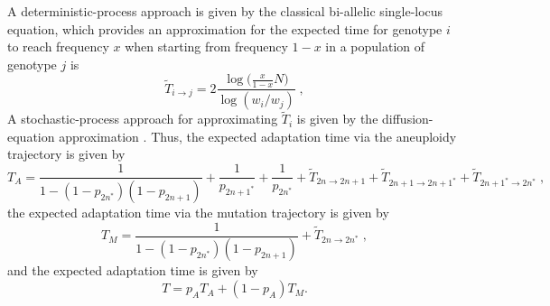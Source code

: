 \documentclass[12pt]{extarticle}
\newtheorem{remark}{Remark}
\begin{document}
A deterministic-process approach is given by the classical bi-allelic single-locus equation, which provides an approximation for the expected time for genotype $i$ to reach frequency $x$ when starting from frequency $1-x$ in a population of genotype $j$ is %
\begin{equation} \label{eq:T_fix_x}
\tilde T_{i \to j} = 2\frac{\log{\big(\frac{x}{1-x}N\big)}}{\log(w_i/w_j)} \;,
\end{equation}
A stochastic-process approach for approximating $\tilde T_i$ is given by the diffusion-equation approximation \citep[eq.~17]{Kimura1969a}. 
Thus, the expected adaptation time via the aneuploidy trajectory is given by
\begin{equation}\label{eq:T_aneu}
 T_A = \frac{1}{1-(1-p_{2n^*})(1-p_{2n+1})} + \frac{1}{p_{2n+1^*}} + \frac{1}{p_{2n^*}} + \tilde T_{2n \to 2n+1} + \tilde T_{2n+1 \to 2n+1^*} + \tilde T_{2n+1^* \to 2n^*} \;,
 \end{equation}
the expected adaptation time via the mutation trajectory is given by 
\begin{equation}\label{eq:T_mut}
T_{M}=\frac{1}{1-(1-p_{2n^*})(1-p_{2n+1})} + \tilde T_{2n \to 2n^*} \;,
\end{equation}
and the expected adaptation time is given by
 \begin{equation}\label{eq:T_total}
 T = p_A T_{A}+(1-p_A) T_{M}.
 \end{equation}

\end{document}
